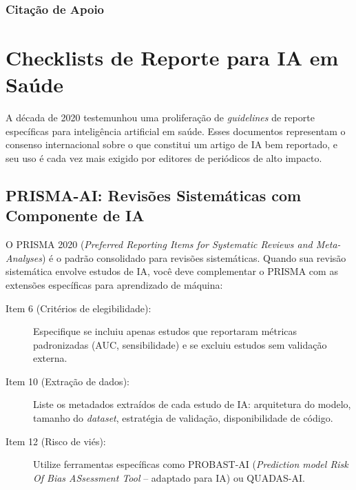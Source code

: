 \subsubsection{Citação de Apoio}


\section{Checklists de Reporte para IA em Saúde}
\label{sec:checklists-ia}

\nivelquatro

A década de 2020 testemunhou uma proliferação de \textit{guidelines} de reporte
específicas para inteligência artificial em saúde. Esses documentos representam
o consenso internacional sobre o que constitui um artigo de IA bem reportado,
e seu uso é cada vez mais exigido por editores de periódicos de alto impacto.


\subsection{PRISMA-AI: Revisões Sistemáticas com Componente de IA}

O PRISMA 2020 (\textit{Preferred Reporting Items for Systematic Reviews and
Meta-Analyses}) é o padrão consolidado para revisões sistemáticas. Quando sua
revisão sistemática envolve estudos de IA, você deve complementar o PRISMA com
as extensões específicas para aprendizado de máquina:

\begin{description}
  \item[Item 6 (Critérios de elegibilidade):] Especifique se incluiu apenas
    estudos que reportaram métricas padronizadas (AUC, sensibilidade) e se
    excluiu estudos sem validação externa.
  \item[Item 10 (Extração de dados):] Liste os metadados extraídos de cada
    estudo de IA: arquitetura do modelo, tamanho do \textit{dataset}, estratégia
    de validação, disponibilidade de código.
  \item[Item 12 (Risco de viés):] Utilize ferramentas específicas como
    PROBAST-AI (\textit{Prediction model Risk Of Bias ASsessment Tool} --
    adaptado para IA) ou QUADAS-AI.
\end{description}

